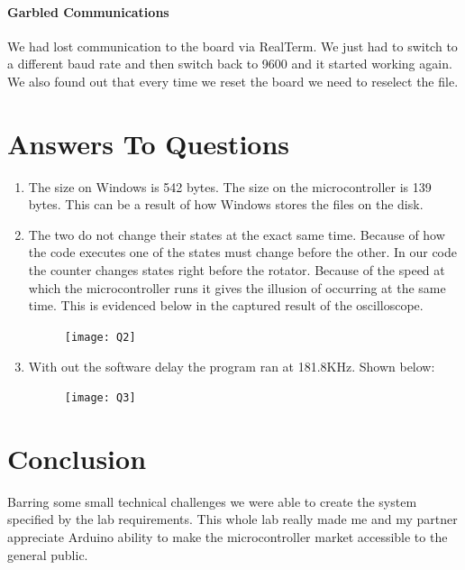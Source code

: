 \documentclass{article}
\begin{document}
\paragraph{Garbled Communications}
We had lost communication to the board via RealTerm. We just had to switch to a different baud rate and then switch back to 9600 and it started working again. We also found out that every time we reset the board we need to reselect the file.

\section*{Answers To Questions}
\begin{enumerate}
	\item The size on Windows is 542 bytes. The size on the microcontroller is 139 bytes. This can be a result of how Windows stores the files on the disk.
	
	\item The two do not change their states at the exact same time. Because of how the code executes one of the states must change before the other. In our code the counter changes states right before the rotator. Because of the speed at which the microcontroller runs it gives the illusion of occurring at the same time. This is evidenced below in the captured result of the oscilloscope. 
	\begin{figure}[H]
		\centering
		\texttt{[image: Q2]}
	\end{figure}

	\item With out the software delay the program ran at 181.8KHz. Shown below:
	\begin{figure}[H]
		\centering
		\texttt{[image: Q3]}
	\end{figure}
\end{enumerate}

\section*{Conclusion}
Barring some small technical challenges we were able to create the system specified by the lab requirements. This whole lab really made me and my partner appreciate Arduino ability to make the microcontroller market accessible to the general public.
\end{document}

